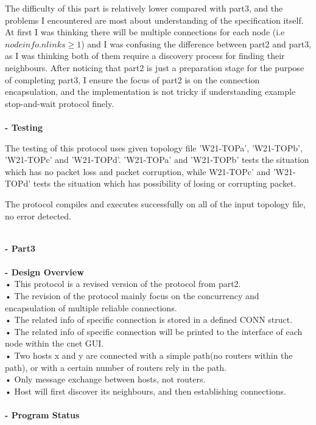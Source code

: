 \documentclass[12pt]{article}
\begin{document}
The difficulty of this part is relatively lower compared with part3, and the problems I encountered are most about understanding of the specification itself. At first I was thinking there will be multiple connections for each node (i.e $nodeinfo.nlinks \ge 1$) and I was confusing the difference between part2 and part3, as I was thinking both of them require a discovery process for finding their neighbours. After noticing that part2 is just a preparation stage for the purpose of completing part3, I ensure the focus of part2 is on the connection encapsulation, and the implementation is not tricky if understanding example stop-and-wait protocol finely.\\
\\{\textbf{- Testing}}

The testing of this protocol uses given topology file 'W21-TOPa', 'W21-TOPb', 'W21-TOPc' and 'W21-TOPd'. 'W21-TOPa' and 'W21-TOPb' tests the situation which has no packet loss and packet corruption, while W21-TOPc' and 'W21-TOPd' tests the situation which has possibility of losing or corrupting packet.

The protocol compiles and executes successfully on all of the input topology file, no error detected.

~\\


\textbf{\large - Part3}\\
\\{\textbf{- Design Overview}}\\
• This protocol is a revised version of the protocol from part2.\\
• The revision of the protocol mainly focus on the concurrency and encapsulation of multiple reliable connections.\\
• The related info of specific connection is stored in a defined CONN struct.\\
• The related info of specific connection will be printed to the interface of each node within the cnet GUI.\\
• Two hosts x and y are connected with a simple path(no routers within the path), or with a certain number of routers rely in the path.\\
• Only message exchange between hosts, not routers.\\
• Host will first discover its neighbours, and then establishing connections.\\
\\{\textbf{- Program Status}}
\end{document}
